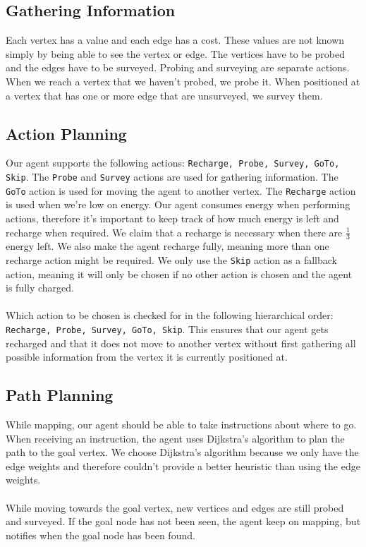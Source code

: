 \documentclass[11pt]{report}
\begin{document}
\subsection*{Gathering Information}
Each vertex has a value and each edge has a cost. These values are not known simply  by being able to see the vertex or edge. The vertices have to be probed and the edges have to be surveyed. Probing and surveying are separate actions. When we reach a vertex that we haven't probed, we probe it. When positioned at a vertex that has one or more edge that are unsurveyed, we survey them.

\subsection*{Action Planning}
Our agent supports the following actions: {\tt Recharge, Probe, Survey, GoTo, Skip}. The {\tt Probe} and {\tt Survey} actions are used for gathering information. The {\tt GoTo} action is used for moving the agent to another vertex. The {\tt Recharge} action is used when we're low on energy. Our agent consumes energy when performing actions, therefore it's important to keep track of how much energy is left and recharge when required. We claim that a recharge is necessary when there are $\frac{1}{3}$ energy left. We also make the agent recharge fully, meaning more than one recharge action might be required. We only use the {\tt Skip} action as a fallback action, meaning it will only be chosen if no other action is chosen and the agent is fully charged.\\
\\
Which action to be chosen is checked for in the following hierarchical order: {\tt Recharge, Probe, Survey, GoTo, Skip}. This ensures that our agent gets recharged and that it does not move to another vertex without first gathering all possible information from the vertex it is currently positioned at.

\subsection*{Path Planning}
While mapping, our agent should be able to take instructions about where to go. When receiving an instruction, the agent uses Dijkstra's algorithm to plan the path to the goal vertex. We choose Dijkstra's algorithm because we only have the edge weights and therefore couldn't provide a better heuristic than using the edge weights.\\
\\
While moving towards the goal vertex, new vertices and edges are still probed and surveyed. If the goal node has not been seen, the agent keep on mapping, but notifies when the goal node has been found.
\end{document}

